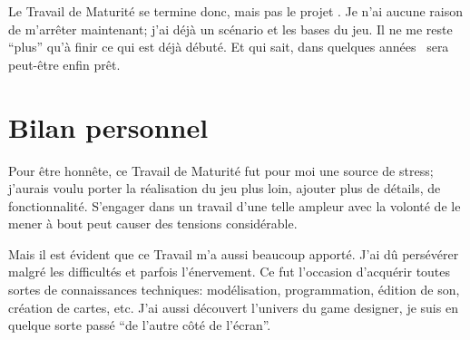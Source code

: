 Le Travail de Maturité se termine donc, mais pas le projet \nomJeu. Je n'ai aucune raison de m'arrêter maintenant; j'ai déjà un scénario et les bases du jeu. Il ne me reste \enquote{plus} qu'à finir ce qui est déjà débuté. Et qui sait, dans quelques années \nomJeu\ sera peut-être enfin prêt.


\section{Bilan personnel}
Pour être honnête, ce Travail de Maturité fut pour moi une source de stress; j'aurais voulu porter la réalisation du jeu plus loin, ajouter plus de détails, de fonctionnalité. S'engager dans un travail d'une telle ampleur avec la volonté de le mener à bout peut causer des tensions considérable.

Mais il est évident que ce Travail m'a aussi beaucoup apporté. J'ai dû persévérer malgré les difficultés et parfois l'énervement. Ce fut l'occasion d'acquérir toutes sortes de connaissances techniques: modélisation, programmation, édition de son, création de cartes, etc. J'ai aussi découvert l'univers du game designer, je suis en quelque sorte passé \enquote{de l'autre côté de l'écran}. 


